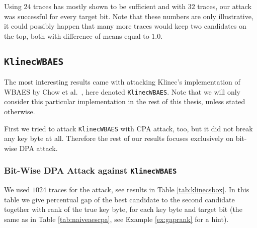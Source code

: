 	Using $24$ traces has mostly shown to be sufficient and with $32$ traces, our attack was successful for every target bit. Note that these numbers are only illustrative, it could possibly happen that many more traces would keep two candidates on the top, both with difference of means equal to $1.0$.
	



\subsection{\tt KlinecWBAES}
\label{sec:klinecwbaes}

\newpage   %
The most interesting results came with attacking Klinec's implementation \cite{klinec2013implementation} of WBAES by Chow et al.\ \cite{chow2002aes}, here denoted {\tt KlinecWBAES}. Note that we will only consider this particular implementation in the rest of this thesis, unless stated otherwise.

First we tried to attack {\tt KlinecWBAES} with CPA attack, too, but it did not break any key byte at all. Therefore the rest of our results focuses exclusively on bit-wise DPA attack.

\subsubsection{Bit-Wise DPA Attack against {\tt KlinecWBAES}}
	
	We used $1024$ traces for the attack, see results in Table \ref{tab:klinecsbox}. In this table we give percentual gap of the best candidate to the second candidate together with rank of the true key byte, for each key byte and target bit (the same as in Table \ref{tab:naiveaescpa}, see Example \ref{ex:gaprank} for a hint).
	
	
